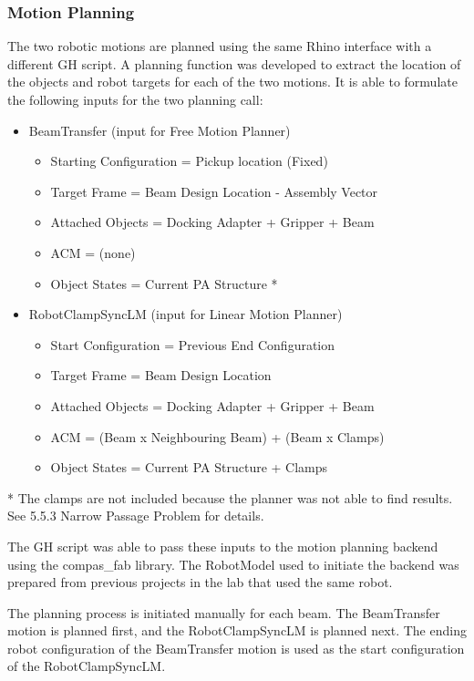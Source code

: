 \begin{itemize}
\begin{enumerate}
\subsubsection{Motion Planning}
The two robotic motions are planned using the same Rhino interface with a different GH script. A planning function was developed to extract the location of the objects and robot targets for each of the two motions. It is able to formulate the following inputs for the two planning call:
\begin{itemize}
\item BeamTransfer (input for Free Motion Planner)
    \begin{itemize}
    \item Starting Configuration = Pickup location (Fixed)
    \item Target Frame = Beam Design Location - Assembly Vector
    \item Attached Objects = Docking Adapter + Gripper + Beam
    \item ACM = (none)
    \item Object States = Current PA Structure *
    \end{itemize}
\item RobotClampSyncLM (input for Linear Motion Planner)
    \begin{itemize}
    \item Start Configuration = Previous End Configuration
    \item Target Frame = Beam Design Location
    \item Attached Objects = Docking Adapter + Gripper + Beam
    \item ACM = (Beam x Neighbouring Beam) + (Beam x Clamps)
    \item Object States = Current PA Structure + Clamps
    \end{itemize}
\end{itemize}
* The clamps are not included because the planner was not able to find results. See 5.5.3 Narrow Passage Problem for details.

The GH script was able to pass these inputs to the motion planning backend using the compas_fab library. The RobotModel used to initiate the backend was prepared from previous projects in the lab that used the same robot. 

The planning process is initiated manually for each beam. The BeamTransfer motion is planned first, and the RobotClampSyncLM is planned next. The ending robot configuration of the BeamTransfer motion is used as the start configuration of the RobotClampSyncLM.


\end{enumerate}
\end{itemize}
